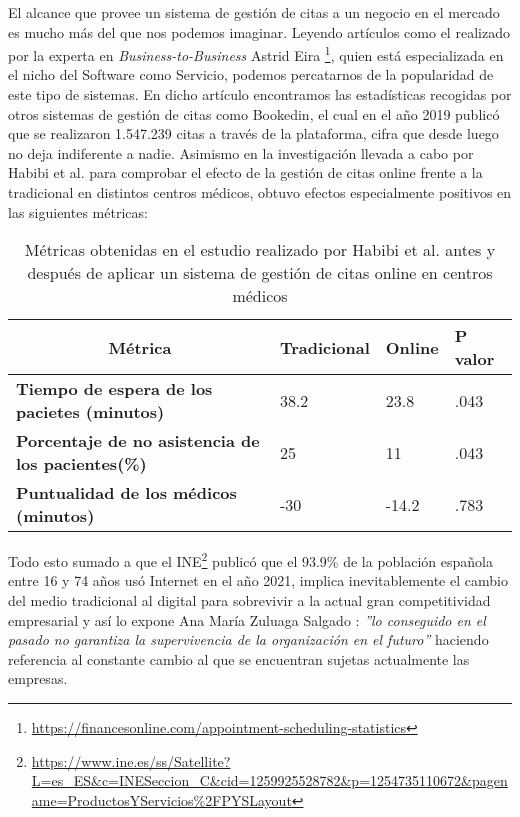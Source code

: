 El alcance que provee un sistema de gestión de citas a un negocio en el mercado es mucho más del que nos podemos imaginar. Leyendo artículos como el realizado por la experta en \textit{Business-to-Business} Astrid Eira \footnote{\url{https://financesonline.com/appointment-scheduling-statistics}}, quien está especializada en el nicho del Software como Servicio, podemos percatarnos de la popularidad de este tipo de sistemas. En dicho artículo encontramos las estadísticas recogidas por otros sistemas de gestión de citas como Bookedin, el cual en el año 2019 publicó que se realizaron 1.547.239 citas a través de la plataforma, cifra que desde luego no deja indiferente a nadie. Asimismo en la investigación llevada a cabo por Habibi et al. \cite{Habibi2019} para comprobar el efecto de la gestión de citas online frente a la tradicional en distintos centros médicos, obtuvo efectos especialmente positivos en las siguientes métricas: \bigskip

\begin{table}[H]
\begin{tabular}{llll}
\hline
\multicolumn{1}{c}{\textbf{Métrica}}                      & \textbf{Tradicional} & \textbf{Online} & \textbf{P valor} \\ \hline
\textbf{Tiempo de espera de los pacietes (minutos)}       & 38.2                 & 23.8            & .043             \\
\textbf{Porcentaje de no asistencia de los pacientes(\%)} & 25                   & 11              & .043             \\
\textbf{Puntualidad de los médicos (minutos)}             & -30                  & -14.2           & .783             \\ \hline
\end{tabular}
\caption{Métricas obtenidas en el estudio realizado por Habibi et al. \cite{Habibi2019} antes y después de aplicar un sistema de gestión de citas online en centros médicos}
\label{table:r7000}
\end{table}

Todo esto sumado a que el INE\footnote{\url{https://www.ine.es/ss/Satellite?L=es_ES&c=INESeccion_C&cid=1259925528782&p=1254735110672&pagename=ProductosYServicios\%2FPYSLayout}} publicó que el 93.9\% de la población española entre 16 y 74 años usó Internet en el año 2021, implica inevitablemente el cambio del medio tradicional al digital para sobrevivir a la actual gran competitividad empresarial y así lo expone Ana María Zuluaga Salgado \cite{zuluaga2019generadores}: \textit{''lo conseguido en el pasado no garantiza la supervivencia de la
organización en el futuro''} haciendo referencia al constante cambio al que se encuentran sujetas actualmente las empresas.\bigskip

